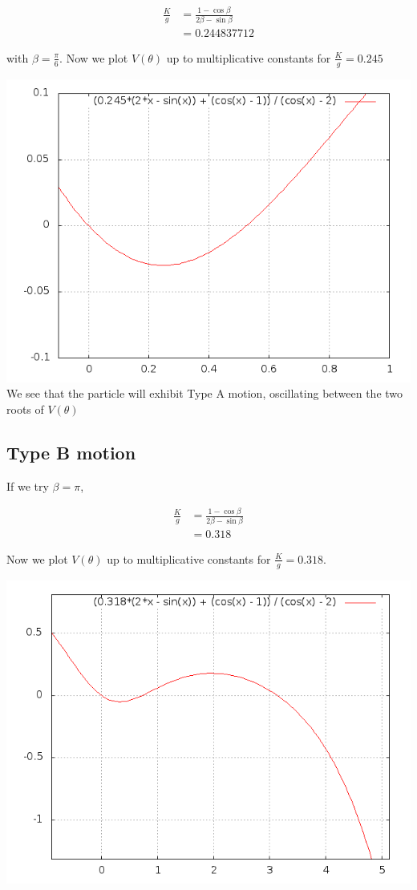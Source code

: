 \documentclass{article}
\begin{document}
\begin{align*}
\frac{K}{g} &= \frac{1 - \cos\beta}{2\beta - \sin\beta} \\
&= 0.244837712
\end{align*}

with $\beta = \frac{\pi}{6}$. Now we plot $V(\theta)$ up to multiplicative constants for $\frac{K}{g} = 0.245$

\includegraphics[width=\textwidth]{4A1.png}
We see that the particle will exhibit Type A motion, oscillating between the two roots of $V(\theta)$

\subsection{Type B motion}

If we try $\beta = \pi$,

\begin{align*}
\frac{K}{g} &= \frac{1 - \cos\beta}{2\beta - \sin\beta} \\
&= 0.318
\end{align*}

Now we plot $V(\theta)$ up to multiplicative constants for $\frac{K}{g} = 0.318$. 

\includegraphics[width=\textwidth]{fail.png}
\end{document}

